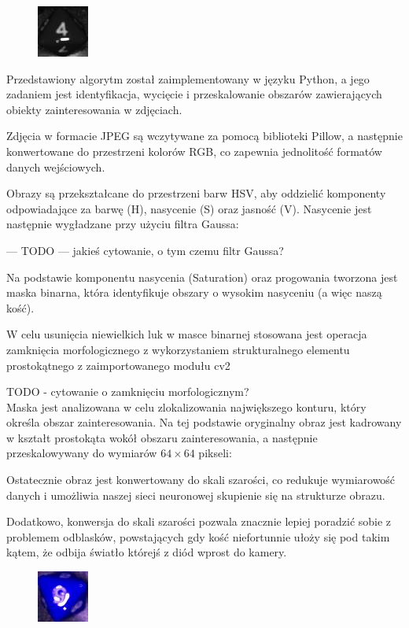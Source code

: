 \begin{figure}[H]
    \centering
    \includegraphics{chapters/04-czytanie/figures/4processed}
    \caption{}
    \label{fig:4proc}
\end{figure}


Przedstawiony algorytm został zaimplementowany w języku Python, a jego zadaniem jest identyfikacja, wycięcie i przeskalowanie obszarów zawierających obiekty zainteresowania w zdjęciach.

Zdjęcia w formacie JPEG są wczytywane za pomocą biblioteki Pillow, a następnie konwertowane do przestrzeni kolorów RGB, co zapewnia jednolitość formatów danych wejściowych.

Obrazy są przekształcane do przestrzeni barw HSV, aby oddzielić komponenty odpowiadające za barwę (H), nasycenie (S) oraz jasność (V).
Nasycenie jest następnie wygładzane przy użyciu filtra Gaussa:

--- TODO ---
jakieś cytowanie, o tym czemu filtr Gaussa?

Na podstawie komponentu nasycenia (Saturation) oraz progowania tworzona jest maska binarna, która identyfikuje obszary o wysokim nasyceniu (a więc naszą kość).

W celu usunięcia niewielkich luk w masce binarnej stosowana jest operacja zamknięcia morfologicznego z wykorzystaniem strukturalnego elementu prostokątnego z zaimportowanego modułu cv2

TODO - cytowanie o zamknięciu morfologicznym?  \\

Maska jest analizowana w celu zlokalizowania największego konturu, który określa obszar zainteresowania.
Na tej podstawie oryginalny obraz jest kadrowany w kształt prostokąta wokół obszaru zainteresowania,
a następnie przeskalowywany do wymiarów $64 \times 64$ pikseli:

Ostatecznie obraz jest konwertowany do skali szarości, co redukuje wymiarowość danych
i umożliwia naszej sieci neuronowej skupienie się na strukturze obrazu.

Dodatkowo, konwersja do skali szarości pozwala znacznie lepiej poradzić sobie z problemem odblasków,
powstających gdy kość niefortunnie ułoży się pod takim kątem, że odbija światło którejś z diód wprost do kamery.


\begin{figure}[H]
    \centering
    \includegraphics{chapters/04-czytanie/figures/blask_raw}
    \caption{}
    \label{fig:blaskraw}
\end{figure}


